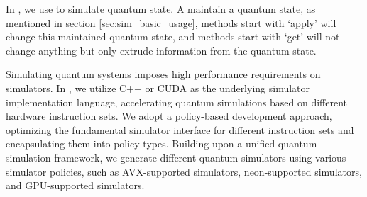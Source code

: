 
In \MindQuantum, we use \Simulator to simulate quantum state. A \Simulator maintain a quantum state, as mentioned in section \ref{sec:sim_basic_usage}, methods start with `apply' will change this maintained quantum state, and methods start with `get' will not change anything but only extrude information from the quantum state.

Simulating quantum systems imposes high performance requirements on simulators. In \MindQuantum, we utilize C++ or CUDA as the underlying simulator implementation language, accelerating quantum simulations based on different hardware instruction sets. We adopt a policy-based development approach, optimizing the fundamental simulator interface for different instruction sets and encapsulating them into policy types. Building upon a unified quantum simulation framework, we generate different quantum simulators using various simulator policies, such as AVX-supported simulators, neon-supported simulators, and GPU-supported simulators.

